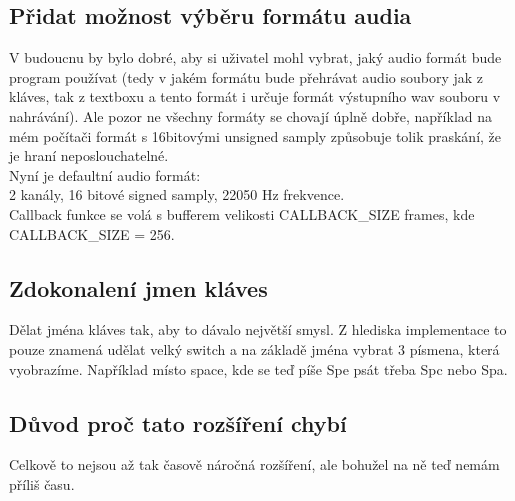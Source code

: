 \documentclass[12pt]{article}
\begin{document}
	\subsection{Přidat možnost výběru formátu audia}
	V budoucnu by bylo dobré, aby si uživatel mohl vybrat, jaký audio formát bude program používat (tedy v jakém formátu bude přehrávat audio soubory jak z kláves, tak z textboxu a tento formát i určuje formát výstupního wav souboru v nahrávání). Ale pozor ne všechny formáty se chovají úplně dobře, například na mém počítači formát s 16bitovými unsigned samply způsobuje tolik praskání, že je hraní neposlouchatelné.
	\\
	Nyní je defaultní audio formát: 
	\\
	2 kanály, 16 bitové signed samply, 22050 Hz frekvence.
	\\
	Callback funkce se volá s bufferem velikosti CALLBACK\_SIZE frames, kde CALLBACK\_SIZE = 256.
	
	\newpage
	\subsection{Zdokonalení jmen kláves}
	Dělat jména kláves tak, aby to dávalo největší smysl. Z hlediska implementace to pouze znamená udělat velký switch a na základě jména vybrat 3 písmena, která vyobrazíme. Například místo space, kde se teď píše Spe psát třeba Spc nebo Spa.
	\subsection{Důvod proč tato rozšíření chybí}
	Celkově to nejsou až tak časově náročná rozšíření, ale bohužel na ně teď nemám příliš času.
\end{document}
